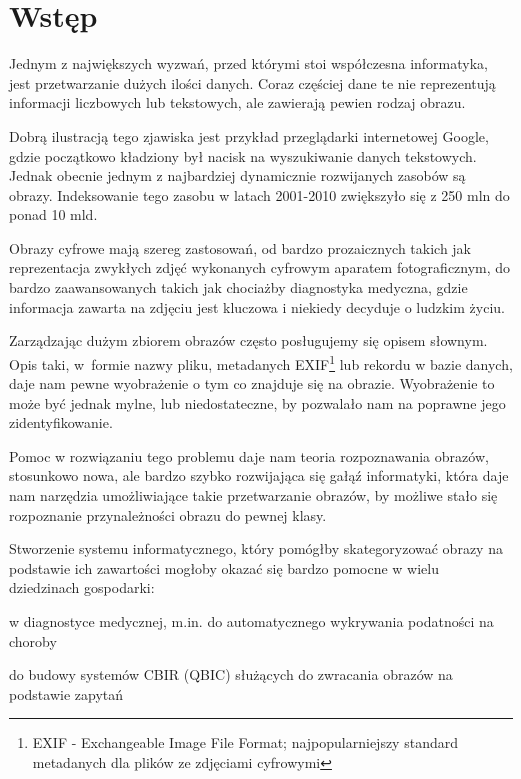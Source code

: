 \chapter*{Wstęp}

Jednym z największych wyzwań, przed którymi stoi współczesna informatyka, jest przetwarzanie dużych ilości danych. Coraz częściej dane te nie reprezentują informacji liczbowych lub tekstowych, ale zawierają pewien rodzaj obrazu. 

Dobrą ilustracją tego zjawiska jest przykład przeglądarki internetowej Google, gdzie początkowo kładziony był nacisk na wyszukiwanie danych tekstowych. Jednak obecnie jednym z najbardziej dynamicznie rozwijanych zasobów są obrazy. Indeksowanie tego zasobu w latach 2001-2010 zwiększyło się z 250 mln do ponad 10 mld.\cite{Google2010}

Obrazy cyfrowe mają szereg zastosowań, od bardzo prozaicznych takich jak reprezentacja zwykłych zdjęć wykonanych cyfrowym aparatem fotograficznym, do bardzo zaawansowanych takich jak chociażby diagnostyka medyczna, gdzie informacja zawarta na zdjęciu jest kluczowa i niekiedy decyduje o ludzkim życiu.

Zarządzając dużym zbiorem obrazów często posługujemy się opisem słownym. Opis taki, w~formie nazwy pliku, metadanych EXIF\footnote{EXIF - Exchangeable Image File Format; najpopularniejszy standard metadanych dla plików ze zdjęciami cyfrowymi} lub rekordu w bazie danych, daje nam pewne wyobrażenie o tym co znajduje się na obrazie. Wyobrażenie to może być jednak mylne, lub niedostateczne, by pozwalało nam na poprawne jego zidentyfikowanie.

Pomoc w rozwiązaniu tego problemu daje nam teoria rozpoznawania obrazów, stosunkowo nowa, ale bardzo szybko rozwijająca się gałąź informatyki, która daje nam narzędzia umożliwiające takie przetwarzanie obrazów, by możliwe stało się rozpoznanie przynależności obrazu do pewnej klasy.\cite{Tad91}

Stworzenie systemu informatycznego, który pomógłby skategoryzować obrazy na podstawie ich zawartości mogłoby okazać się bardzo pomocne w wielu dziedzinach gospodarki:
\begin{packed_list}
	\item w diagnostyce medycznej, m.in. do automatycznego wykrywania podatności na choroby
	\item do budowy systemów CBIR (QBIC) służących do zwracania obrazów na podstawie zapytań\cite{LZLM06}
\end{packed_list}

